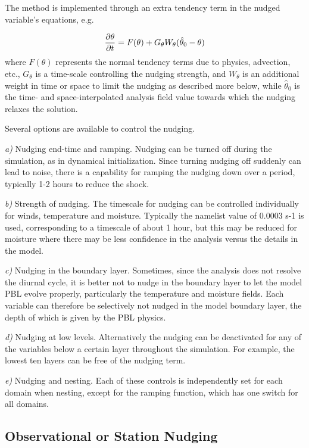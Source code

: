 The method is implemented through an extra tendency term in the nudged variable's equations, e.g.

$$ {\partial \theta \over \partial t} = F(\theta) + G_{\theta} W_{\theta} ( \hat \theta_0 - \theta)  $$
where $F(\theta)$ represents the normal tendency terms due to physics, advection, etc., $G_{\theta}$ is a time-scale controlling the nudging strength, and $W_{\theta}$ is an additional weight in time or space to limit the nudging as described more below, while $\hat \theta_0$ is the time- and space-interpolated analysis field value towards which the nudging relaxes the solution.

Several options are available to control the nudging.

{\it a)} Nudging end-time and ramping. Nudging can be turned off during the simulation, as in dynamical initialization. Since turning nudging off suddenly can lead to noise, there is a capability for ramping the nudging down over a period, typically 1-2 hours to reduce the shock.

{\it b)} Strength of nudging. The timescale for nudging can be controlled individually for winds, temperature and moisture. Typically the namelist value of  0.0003 s-1 is used, corresponding to a timescale of about 1 hour, but this may be reduced for moisture where there may be less confidence in the analysis versus the details in the model.

{\it c)} Nudging in the boundary layer. Sometimes, since the analysis does not resolve the diurnal cycle, it is better not to nudge in the boundary layer to let the model PBL evolve properly, particularly the temperature and moisture fields. Each variable can therefore be selectively not nudged in the model boundary layer, the depth of which is given by the PBL physics.

{\it d)} Nudging at low levels. Alternatively the nudging can be deactivated for any of the variables below a certain layer throughout the simulation. For example, the lowest ten layers can be free of the nudging term. 

{\it e)} Nudging and nesting. Each of these controls is independently set for each domain when nesting, except for the ramping function, which has one switch for all domains.

\subsection{Observational or Station Nudging}

